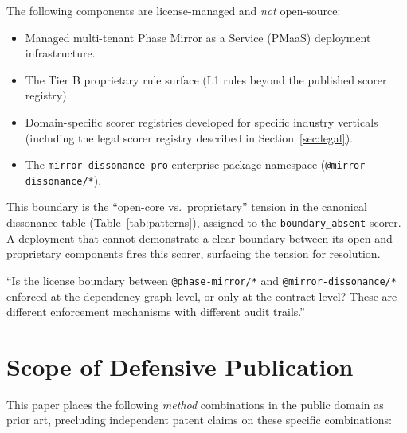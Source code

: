 \documentclass[11pt,letterpaper]{article}
\theoremstyle{remark}
\begin{document}
The following components are license-managed and \emph{not} open-source:

\begin{itemize}[leftmargin=1.5em]
  \item Managed multi-tenant Phase Mirror as a Service (PMaaS)
        deployment infrastructure.
  \item The Tier B proprietary rule surface (L1 rules beyond the
        published scorer registry).
  \item Domain-specific scorer registries developed for specific
        industry verticals (including the legal scorer registry
        described in Section~\ref{sec:legal}).
  \item The \texttt{mirror-dissonance-pro} enterprise package
        namespace (\texttt{@mirror-dissonance/*}).
\end{itemize}

This boundary is the ``open-core vs.\ proprietary'' tension in the
canonical dissonance table (Table~\ref{tab:patterns}), assigned to
the \texttt{boundary\_absent} scorer.  A deployment that cannot
demonstrate a clear boundary between its open and proprietary
components fires this scorer, surfacing the tension for resolution.

\begin{precisionbox}
``Is the license boundary between \texttt{@phase-mirror/*} and
\texttt{@mirror-dissonance/*} enforced at the dependency graph level,
or only at the contract level?  These are different enforcement
mechanisms with different audit trails.''
\end{precisionbox}

\section{Scope of Defensive Publication}
\label{sec:prior-art}

This paper places the following \emph{method} combinations in the
public domain as prior art, precluding independent patent claims on
these specific combinations:
\end{document}
